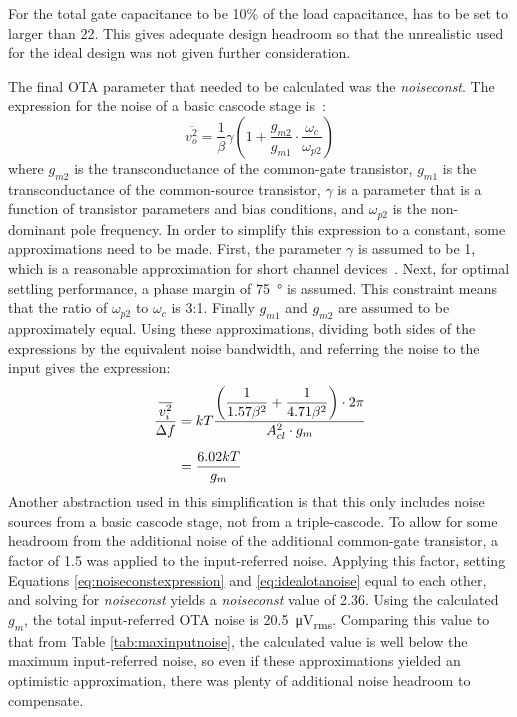 For the total gate capacitance to be 10\% of the load capacitance, \gmid\spc has to be set to larger than 22. This gives adequate design headroom so that the unrealistic \gmid\spc used for the ideal design was not given further consideration.

The final OTA parameter that needed to be calculated was the \emph{noiseconst}. The expression for the noise of a basic cascode stage is~\cite{315areader}:
\begin{equation}
\label{eq:cascoutputnoise}
\overline{v_{o}^{2}} = \dfrac{1}{\beta}\gamma\left(1+\dfrac{g_{m2}}{g_{m1}}\cdot\dfrac{\omega_{c}}{\omega_{p2}}\right)
\end{equation}
where $g_{m2}$ is the transconductance of the common-gate transistor, $g_{m1}$ is the transconductance of the common-source transistor, $\gamma$ is a parameter that is a function of transistor parameters and bias conditions, and $\omega_{p2}$ is the non-dominant pole frequency. In order to simplify this expression to a constant, some approximations need to be made. First, the parameter $\gamma$ is assumed to be 1, which is a reasonable approximation for short channel devices~\cite{1202575}. Next, for optimal settling performance, a phase margin of \SI{75}{\degree} is assumed. This constraint means that the ratio of $\omega_{p2}$ to $\omega_{c}$ is 3:1. Finally $g_{m1}$ and $g_{m2}$ are assumed to be approximately equal. Using these approximations, dividing both sides of the expressions by the equivalent noise bandwidth, and referring the noise to the input gives the expression:
\begin{align}
\label{eq:noiseconstexpression}
\dfrac{\overline{v_{i}^{2}}}{\Delta f} &= kT\dfrac{\left(\dfrac{1}{1.57\beta^{2}}+\dfrac{1}{4.71\beta^{2}}\right)\cdot 2\pi}{A_{cl}^{2}\cdot g_{m}} \\[0.5em]
\nonumber &= \dfrac{6.02kT}{g_{m}}
\end{align}
Another abstraction used in this simplification is that this only includes noise sources from a basic cascode stage, not from a triple-cascode. To allow for some headroom from the additional noise of the additional common-gate transistor, a factor of 1.5 was applied to the input-referred noise. Applying this factor, setting Equations \ref{eq:noiseconstexpression} and \ref{eq:idealotanoise} equal to each other, and solving for \emph{noiseconst} yields a \emph{noiseconst} value of 2.36. Using the calculated $g_{m}$, the total input-referred OTA noise is \SI{20.5}{\micro\volt_{rms}}. Comparing this value to that from Table \ref{tab:maxinputnoise}, the calculated value is well below the maximum input-referred noise, so even if these approximations yielded an optimistic approximation, there was plenty of additional noise headroom to compensate.

